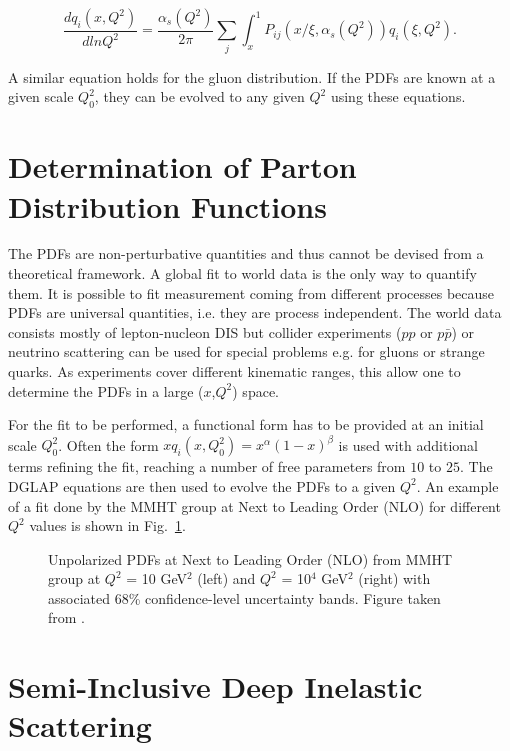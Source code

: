 \begin{equation}
  \frac{dq_i(x,Q^2)}{dlnQ^2} = \frac{\alpha_s(Q^2)}{2\pi}\sum\limits_{j}\int_{x}^{1}P_{ij}(x/\xi,\alpha_s(Q^2))q_i(\xi,Q^2).
\end{equation}

A similar equation holds for the gluon distribution. If the PDFs are known at a given scale $Q_0^2$, they can be evolved to any given $Q^2$ using these equations.


\section{Determination of Parton Distribution Functions}

The PDFs are non-perturbative quantities and thus cannot be devised from a theoretical framework. A global fit to world data is the only way to quantify them. It is possible to fit measurement coming from different processes because PDFs are universal quantities, i.e. they are process independent. The world data consists mostly of lepton-nucleon DIS but collider experiments ($pp$ or $p\bar{p}$) or neutrino scattering can be used for special problems e.g. for gluons or strange quarks. As experiments cover different kinematic ranges, this allow one to determine the PDFs in a large ($x$,$Q^2$) space.

For the fit to be performed, a functional form has to be provided at an initial scale $Q^2_0$. Often the form $xq_i(x,Q^2_0) = x^{\alpha}(1-x)^{\beta}$ is used with additional terms refining the fit, reaching a number of free parameters from $10$ to $25$. The DGLAP equations are then used to evolve the PDFs to a given $Q^2$. An example of a fit done by the MMHT group at Next to Leading Order (NLO) for different $Q^2$ values is shown in Fig.~\ref{fig:MMHT}.

\begin{figure}[htb!]
\centerline{}
\caption{Unpolarized PDFs at Next to Leading Order (NLO) from MMHT group at $Q^2$ = 10 GeV$^2$ (left) and $Q^2$ = 10$^4$ GeV$^2$ (right) with associated 68\% confidence-level uncertainty bands. Figure taken from \cite{MMHT}.}\label{fig:MMHT}
\end{figure}


\section{Semi-Inclusive Deep Inelastic Scattering}

